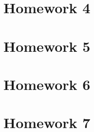 \documentclass[12pt]{article}
\begin{document}
\newpage

\section{Homework 4}



\newpage

\section{Homework 5}



\newpage

\section{Homework 6}


\newpage

\section{Homework 7}


\end{document}
